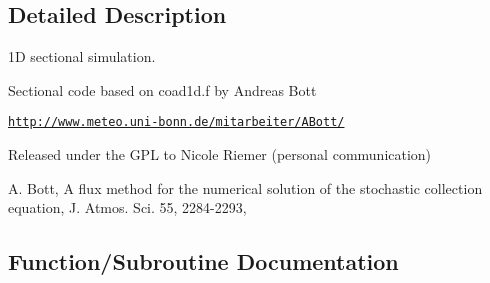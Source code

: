 \subsection{Detailed Description}
1D sectional simulation. 

Sectional code based on {\ttfamily coad1d.\+f} by Andreas Bott
\begin{DoxyItemize}
\item \href{http://www.meteo.uni-bonn.de/mitarbeiter/ABott/}{\tt http\+://www.\+meteo.\+uni-\/bonn.\+de/mitarbeiter/\+A\+Bott/}
\item Released under the G\+PL to Nicole Riemer (personal communication)
\item A. Bott, A flux method for the numerical solution of the stochastic collection equation, J. Atmos. Sci. 55, 2284-\/2293,
\begin{DoxyEnumerate}
\item 
\end{DoxyEnumerate}
\end{DoxyItemize}

\subsection{Function/\+Subroutine Documentation}
\mbox{\label{namespacepmc__run__sect_ab0cefd419d24a8416f61f3d6a1098f0e}} 
